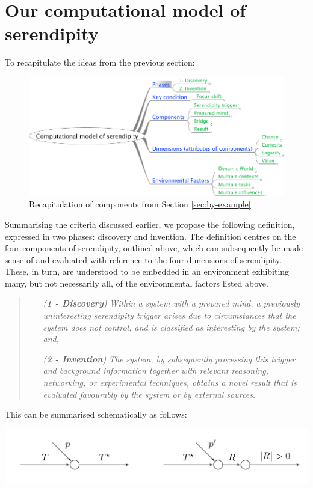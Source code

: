 \section{Our computational model of serendipity} \label{sec:our-model}

To recapitulate the ideas from the previous section:

\begin{figure}
\begin{center}
\includegraphics[width=.8\textwidth]{figures/model-diagram/mm-model-diagram-no-desc.png}
\end{center}
\caption{Recapitulation of components from Section \ref{sec:by-example}}
\end{figure}

Summarising the criteria discussed earlier, we propose the following
definition, expressed in two phases: discovery and invention.  The
definition centres on the four components of serendipity, outlined
above, which can subsequently be made sense of and evaluated with
reference to the four dimensions of serendipity.  These, in turn, are
understood to be embedded in an environment exhibiting many, but not
necessarily all, of the environmental factors listed above.

\begin{quote}
\begin{enumerate}[itemsep=2pt,labelwidth=9em,leftmargin=6em,rightmargin=2em]
\item[\emph{(\textbf{1 - Discovery})}] \emph{Within a system with a prepared mind, a previously uninteresting serendipity trigger arises due to circumstances that the system does not control, and is classified as interesting by the system; and,}
\item[\emph{(\textbf{2 - Invention})}] \emph{The system, by subsequently processing this trigger and background information together with relevant reasoning, networking, or experimental techniques, obtains a novel result that is evaluated favourably by the system or by external sources.}
\end{enumerate}
\end{quote}

This can be summarised schematically as follows:

% 
{\centering
\includegraphics[width=.8\textwidth]{schematic}
\par}

